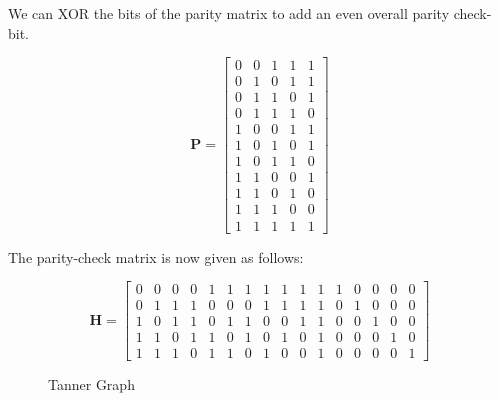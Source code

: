 \documentclass[fleqn]{article}
\begin{document}
\begin{enumerate}
\begin{enumerate}
			We can XOR the bits of the parity matrix to add an even overall parity check-bit.
			
			\begin{equation*}
				\mathbf{P} = \begin{bmatrix}
					0 & 0 & 1 & 1 & 1 \\
					0 & 1 & 0 & 1 & 1 \\
					0 & 1 & 1 & 0 & 1 \\
					0 & 1 & 1 & 1 & 0 \\
					1 & 0 & 0 & 1 & 1 \\
					1 & 0 & 1 & 0 & 1 \\
					1 & 0 & 1 & 1 & 0 \\
					1 & 1 & 0 & 0 & 1 \\
					1 & 1 & 0 & 1 & 0 \\
					1 & 1 & 1 & 0 & 0 \\
					1 & 1 & 1 & 1 & 1
				\end{bmatrix}
			\end{equation*}
			
			The parity-check matrix is now given as follows:
			
			\begin{equation*}
				\mathbf{H} = \begin{bmatrix}
					0 & 0 & 0 & 0 & 1 & 1 & 1 & 1 & 1 & 1 & 1 & 1 & 0 & 0 & 0 & 0\\
					0 & 1 & 1 & 1 & 0 & 0 & 0 & 1 & 1 & 1 & 1 & 0 & 1 & 0 & 0 & 0\\
					1 & 0 & 1 & 1 & 0 & 1 & 1 & 0 & 0 & 1 & 1 & 0 & 0 & 1 & 0 & 0\\
					1 & 1 & 0 & 1 & 1 & 0 & 1 & 0 & 1 & 0 & 1 & 0 & 0 & 0 & 1 & 0\\
					1 & 1 & 1 & 0 & 1 & 1 & 0 & 1 & 0 & 0 & 1 & 0 & 0 & 0 & 0 & 1
				\end{bmatrix}
			\end{equation*}
				
			\begin{figure}[H]
				\centerline{}
				\caption{Tanner Graph}
				\label{fig::tanner_graph}
			\end{figure}


\end{enumerate}
\end{enumerate}
\end{document}
